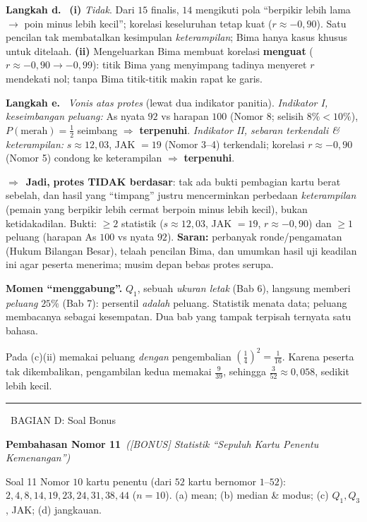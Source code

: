 \documentclass[11pt,a4paper]{article}
\newcommand{\langkah}[1]{\par\smallskip\noindent\textbf{\textcolor{biru}{Langkah #1.}}\ }
\newcommand{\jadi}{\par\smallskip\noindent$\Rightarrow$\ \textbf{Jadi, }}
\newcommand{\bagianjudul}[1]{\par\bigskip\noindent%
  {\large\bfseries\color{ungu}\rule[-2pt]{4pt}{16pt}\ #1}\par\smallskip}
\newcommand{\nomorjudul}[2]{\par\bigskip\noindent%
  {\large\bfseries\color{ungu}Pembahasan Nomor #1}\ {\normalfont\itshape\color{gray}(#2)}\par\nopagebreak\smallskip}
\begin{document}
\langkah{d} \textbf{(i)} \emph{Tidak}. Dari $15$ finalis, $14$ mengikuti pola
``berpikir lebih lama $\to$ poin minus lebih kecil''; korelasi keseluruhan tetap
kuat ($r\approx-0{,}90$). Satu pencilan tak membatalkan kesimpulan
\emph{keterampilan}; Bima hanya kasus khusus untuk ditelaah.
\textbf{(ii)} Mengeluarkan Bima membuat korelasi \textbf{menguat}
($r\approx-0{,}90\to-0{,}99$): titik Bima yang menyimpang tadinya menyeret $r$
mendekati nol; tanpa Bima titik-titik makin rapat ke garis.

\langkah{e} \emph{Vonis atas protes} (lewat dua indikator panitia).
\emph{Indikator I, keseimbangan peluang:} As nyata $92$ vs harapan $100$
(Nomor 8; selisih $8\%<10\%$), $P(\text{merah})=\tfrac12$ seimbang $\Rightarrow$
\textbf{terpenuhi}. \emph{Indikator II, sebaran terkendali \& keterampilan:}
$s\approx12{,}03$, JAK $=19$ (Nomor 3--4) terkendali; korelasi $r\approx-0{,}90$
(Nomor 5) condong ke keterampilan $\Rightarrow$ \textbf{terpenuhi}.
\jadi \textbf{protes TIDAK berdasar}: tak ada bukti pembagian kartu berat sebelah,
dan hasil yang ``timpang'' justru mencerminkan perbedaan \emph{keterampilan}
(pemain yang berpikir lebih cermat berpoin minus lebih kecil), bukan
ketidakadilan. Bukti: $\ge2$ statistik ($s\approx12{,}03$, JAK $=19$,
$r\approx-0{,}90$) dan $\ge1$ peluang (harapan As $100$ vs nyata $92$).
\textbf{Saran:} perbanyak ronde/pengamatan (Hukum Bilangan Besar), telaah pencilan
Bima, dan umumkan hasil uji keadilan ini agar peserta menerima; musim depan
bebas protes serupa.

\begin{tips}
\textbf{Momen ``menggabung''.} $Q_1$, sebuah \emph{ukuran letak} (Bab 6),
langsung memberi \emph{peluang} $25\%$ (Bab 7): persentil \emph{adalah} peluang.
Statistik menata data; peluang membacanya sebagai kesempatan. Dua bab yang tampak
terpisah ternyata satu bahasa.
\end{tips}

\begin{jebakan}
Pada (c)(ii) memakai peluang \emph{dengan} pengembalian
$\left(\tfrac14\right)^2=\tfrac{1}{16}$. Karena peserta tak dikembalikan,
pengambilan kedua memakai $\tfrac{9}{39}$, sehingga
$\tfrac{3}{52}\approx0{,}058$, sedikit lebih kecil.
\end{jebakan}

\bagianjudul{BAGIAN D: Soal Bonus}

\nomorjudul{11}{[BONUS] Statistik ``Sepuluh Kartu Penentu Kemenangan''}
\begin{soalbox}{Soal 11}
Nomor $10$ kartu penentu (dari $52$ kartu bernomor $1$--$52$):
$2,4,8,14,19,23,24,31,38,44$ ($n=10$). (a) mean; (b) median \& modus;
(c) $Q_1,Q_3$, JAK; (d) jangkauan.
\end{soalbox}
\end{document}
